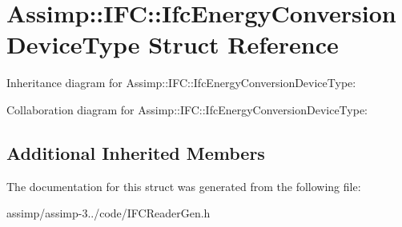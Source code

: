 \hypertarget{struct_assimp_1_1_i_f_c_1_1_ifc_energy_conversion_device_type}{\section{Assimp\+:\+:I\+F\+C\+:\+:Ifc\+Energy\+Conversion\+Device\+Type Struct Reference}
\label{struct_assimp_1_1_i_f_c_1_1_ifc_energy_conversion_device_type}
}


Inheritance diagram for Assimp\+:\+:I\+F\+C\+:\+:Ifc\+Energy\+Conversion\+Device\+Type\+:


Collaboration diagram for Assimp\+:\+:I\+F\+C\+:\+:Ifc\+Energy\+Conversion\+Device\+Type\+:
\subsection*{Additional Inherited Members}


The documentation for this struct was generated from the following file\+:\begin{DoxyCompactItemize}
\item 
assimp/assimp-\/3../code/I\+F\+C\+Reader\+Gen.\+h\end{DoxyCompactItemize}
